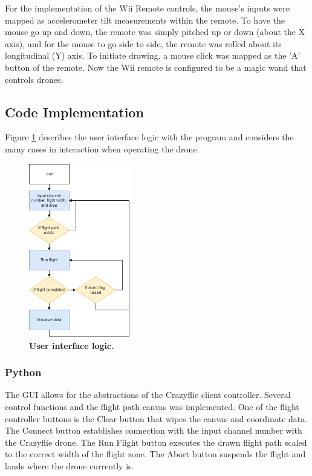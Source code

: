 \documentclass[conf]{new-aiaa}
\begin{document}
        For the implementation of the Wii Remote controls, the mouse's inputs were mapped as accelerometer tilt measurements within the remote. To have the mouse go up and down, the remote was simply pitched up or down (about the X axis), and for the mouse to go side to side, the remote was rolled about its longitudinal (Y) axis. To initiate drawing, a mouse click was mapped as the 'A' button of the remote. Now the Wii remote is configured to be a magic wand that controls drones.


    \subsection{Code Implementation}
    
        Figure \ref{fig:code_logic} describes the user interface logic with the program and considers the many cases in interaction when operating the drone. 
        
        \begin{figure}[H]
            \centering
            \includegraphics[width=0.4\textwidth]{docs/reports/Final Project Update/images/ae483_code_logic.png}
            \caption{\textbf{User interface logic.}}
            \label{fig:code_logic}
        \end{figure}
    
        \subsubsection{Python}
        
            The GUI allows for the abstractions of the Crazyflie client controller. Several control functions and the flight path canvas was implemented. One of the flight controller buttons is the Clear button that wipes the canvas and coordinate data. The Connect button establishes connection with the input channel number with the Crazyflie drone. The Run Flight button executes the drawn flight path scaled to the correct width of the flight zone. The Abort button suspends the flight and lands where the drone currently is.
            
\end{document}
